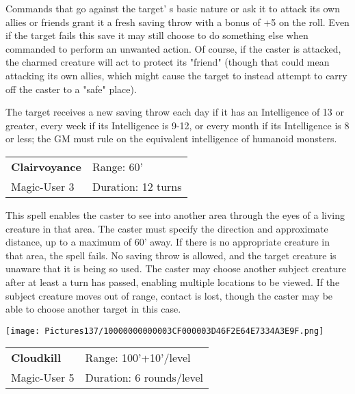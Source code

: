 \documentclass[a4paper,twoside,openany,10pt]{book}
\begin{document}
\begin{multicols}{2}
Commands that go against the target' s basic nature or ask it to attack its own allies or friends grant it a fresh saving throw with a bonus of +5 on the roll. Even if the target fails this save it may still choose to do something else when commanded to perform an unwanted action. Of course, if the caster is attacked, the charmed creature will act to protect its "friend" (though that could mean attacking its own allies, which might cause the target to instead attempt to carry off the caster to a "safe" place).

The target receives a new saving throw each day if it has an Intelligence of 13 or greater, every week if its Intelligence is 9-12, or every month if its Intelligence is 8 or less; the GM must rule on the equivalent intelligence of humanoid monsters.\medskip


\smallskip\begin{flushleft} 
	\begin{tabularx}{0.45\textwidth}{@{}m{3.5cm}m{5.5cm}@{}} 
		\textbf{Clairvoyance} & Range: 60'\\
		Magic-User 3 & Duration: 12 turns\\	
	\end{tabularx}\end{flushleft}

This spell enables the caster to see into another area through the eyes of a living creature in that area. The caster must specify the direction and approximate distance, up to a maximum of 60'{} away. If there is no appropriate creature in that area, the spell fails. No saving throw is allowed, and the target creature is unaware that it is being so used. The caster may choose another subject creature after at least a turn has passed, enabling multiple locations to be viewed. If the subject creature moves out of range, contact is lost, though the caster may be able to choose another target in this case.


\begin{flushleft}	
	\texttt{[image: Pictures137/10000000000003CF000003D46F2E64E7334A3E9F.png]}
\end{flushleft}

\smallskip\begin{flushleft} 
	\begin{tabularx}{0.45\textwidth}{@{}m{3.5cm}m{5.5cm}@{}} 
		\textbf{Cloudkill} & Range: 100'+10'/level\\
		Magic-User 5 & Duration: 6 rounds/level\\	
	\end{tabularx}\end{flushleft}


\end{multicols}
\end{document}
